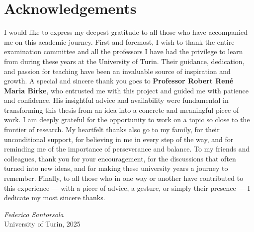 \chapter*{Acknowledgements}
I would like to express my deepest gratitude to all those who have accompanied me on this academic journey.  
First and foremost, I wish to thank the entire examination committee and all the professors I have had the privilege to learn from during these years at the University of Turin.  
Their guidance, dedication, and passion for teaching have been an invaluable source of inspiration and growth.
A special and sincere thank you goes to \textbf{Professor Robert René Maria Birke}, who entrusted me with this project and guided me with patience and confidence.  
His insightful advice and availability were fundamental in transforming this thesis from an idea into a concrete and meaningful piece of work.  
I am deeply grateful for the opportunity to work on a topic so close to the frontier of research.
My heartfelt thanks also go to my family, for their unconditional support, for believing in me in every step of the way, and for reminding me of the importance of perseverance and balance.  
To my friends and colleagues, thank you for your encouragement, for the discussions that often turned into new ideas, and for making these university years a journey to remember.
Finally, to all those who in one way or another have contributed to this experience — with a piece of advice, a gesture, or simply their presence — I dedicate my most sincere thanks.

\vspace{2em}

\begin{flushright}
\textit{Federico Santorsola}\\
University of Turin, 2025
\end{flushright}